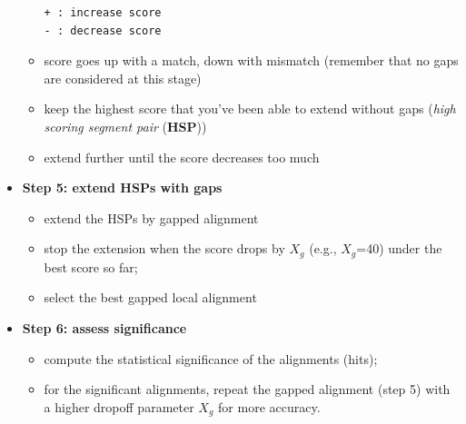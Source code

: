 \begin{itemize}
\begin{itemize}
\begin{verbatim}
+ : increase score
- : decrease score
\end{verbatim}

  \item score goes up with a match, down with mismatch (remember that no gaps are considered at this stage)
  \item keep the highest score that you've been able to extend without gaps 
        ({\em high scoring segment pair} ({\bf HSP}))
  \item extend further until the score decreases too much
  \end{itemize}

\item {\bf Step 5: extend HSPs with gaps}
  \begin{itemize}
  \item extend the HSPs by gapped alignment
  \item stop the extension when the score drops by $X_g$ (e.g., $X_g$=40) under the best score so far;
  \item select the best gapped local alignment
  \end{itemize}

\item {\bf Step 6: assess significance}
  \begin{itemize}
  \item compute the statistical significance of the alignments (hits);
  \item for the significant alignments, repeat the gapped alignment (step 5) with a higher dropoff parameter $X_g$ for more accuracy.
  \end{itemize}

\end{itemize}




